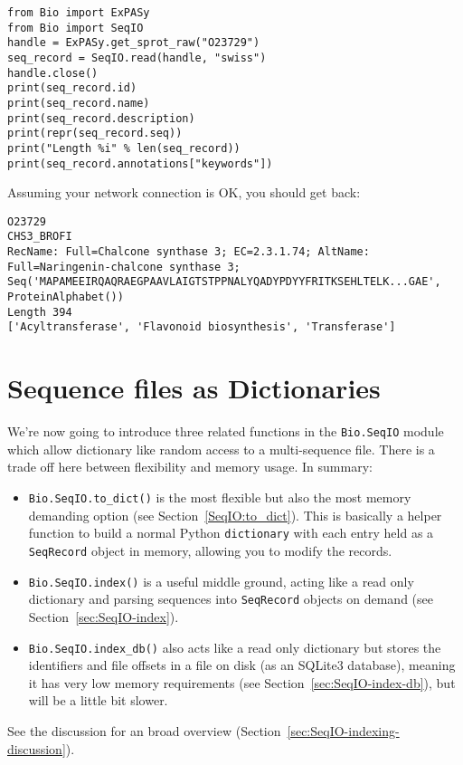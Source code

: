 \documentclass{report}
\begin{document}
\begin{verbatim}
from Bio import ExPASy
from Bio import SeqIO
handle = ExPASy.get_sprot_raw("O23729")
seq_record = SeqIO.read(handle, "swiss")
handle.close()
print(seq_record.id)
print(seq_record.name)
print(seq_record.description)
print(repr(seq_record.seq))
print("Length %i" % len(seq_record))
print(seq_record.annotations["keywords"])
\end{verbatim}

\noindent Assuming your network connection is OK, you should get back:

\begin{verbatim}
O23729
CHS3_BROFI
RecName: Full=Chalcone synthase 3; EC=2.3.1.74; AltName: Full=Naringenin-chalcone synthase 3;
Seq('MAPAMEEIRQAQRAEGPAAVLAIGTSTPPNALYQADYPDYYFRITKSEHLTELK...GAE', ProteinAlphabet())
Length 394
['Acyltransferase', 'Flavonoid biosynthesis', 'Transferase']
\end{verbatim}

\section{Sequence files as Dictionaries}

We're now going to introduce three related functions in the \verb|Bio.SeqIO|
module which allow dictionary like random access to a multi-sequence file.
There is a trade off here between flexibility and memory usage. In summary:
\begin{itemize}
\item \verb|Bio.SeqIO.to_dict()| is the most flexible but also the most
memory demanding option (see Section~\ref{SeqIO:to_dict}). This is basically
a helper function to build a normal Python \verb|dictionary| with each entry
held as a \verb|SeqRecord| object in memory, allowing you to modify the
records.
\item \verb|Bio.SeqIO.index()| is a useful middle ground, acting like a
read only dictionary and parsing sequences into \verb|SeqRecord| objects
on demand (see Section~\ref{sec:SeqIO-index}).
\item \verb|Bio.SeqIO.index_db()| also acts like a read only dictionary
but stores the identifiers and file offsets in a file on disk (as an
SQLite3 database), meaning it has very low memory requirements (see
Section~\ref{sec:SeqIO-index-db}), but will be a little bit slower.
\end{itemize}
See the discussion for an broad overview
(Section~\ref{sec:SeqIO-indexing-discussion}).
\end{document}
